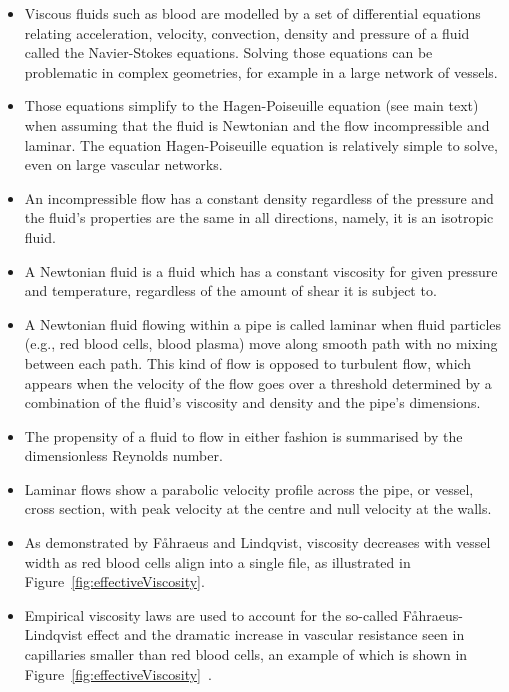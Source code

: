 \documentclass{article}
\begin{document}
\begin{tcolorbox}[title=Additional information -- Fluid flow modelling]
  \begin{itemize}
  \item Viscous fluids such as blood are modelled by a set of differential equations relating acceleration, velocity, convection, density and pressure of a fluid called the Navier-Stokes equations.
    Solving those equations can be problematic in complex geometries, for example in a large network of vessels.
  \item Those equations simplify to the Hagen-Poiseuille equation (see main text) when assuming that the fluid is Newtonian and the flow incompressible and laminar.
    The equation Hagen-Poiseuille equation is relatively simple to solve, even on large vascular networks.
  \item An incompressible flow has a constant density regardless of the pressure and the fluid's properties are the same in all directions, namely, it is an isotropic fluid.
  \item A Newtonian fluid is a fluid which has a constant viscosity for given pressure and temperature, regardless of the amount of shear it is subject to.
  \item A Newtonian fluid flowing within a pipe is called laminar when fluid particles (e.g., red blood cells, blood plasma) move along smooth path with no mixing between each path.
    This kind of flow is opposed to turbulent flow, which appears when the velocity of the flow goes over a threshold determined by a combination of the fluid's viscosity and density and the pipe's dimensions.
  \item The propensity of a fluid to flow in either fashion is summarised by the dimensionless Reynolds number.
  \item Laminar flows show a parabolic velocity profile across the pipe, or vessel, cross section, with peak velocity at the centre and null velocity at the walls.
  \item As demonstrated by F\r ahraeus and Lindqvist, viscosity decreases with vessel width as red blood cells align into a single file, as illustrated in Figure~\ref{fig:effectiveViscosity}\cite{Faahraeus_1931}.
  \item Empirical viscosity laws are used to account for the so-called F\r ahraeus-Lindqvist effect and the dramatic increase in vascular resistance seen in capillaries smaller than red blood cells, an example of which is shown in Figure~\ref{fig:effectiveViscosity}~\cite{Haynes_1960,Pries_1990,Secomb_2013}.
  \end{itemize}
\end{tcolorbox}
\end{document}
